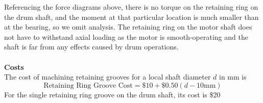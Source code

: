 \documentclass[letterpaper,12pt]{article}
\begin{document}
\noindent Referencing the force diagrams above, there is no torque on the retaining ring on the drum shaft, and the moment at that particular location is much smaller than at the bearing, so we omit analysis. The retaining ring on the motor shaft does not have to withstand axial loading as the motor is smooth-operating and the shaft is far from any effects caused by drum operations. 
\\\\
\textbf{Costs}
\\
The cost of machining retaining grooves for a local shaft diameter $d$ in mm is
\begin{equation}
    \text{Retaining Ring Groove Cost} = \$10 + \$0.50(d - 10\text{mm})
\end{equation}
For the single retaining ring groove on the drum shaft, its cost is \$20
\end{document}

